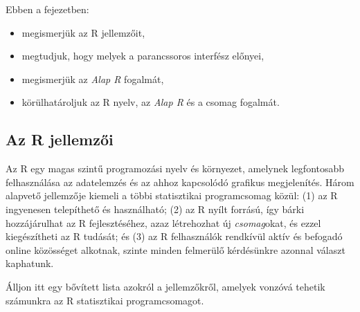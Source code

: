 \documentclass[
]{book}
\makeatletter
\providecommand{\tightlist}{%
  \setlength{\itemsep}{0pt}\setlength{\parskip}{0pt}}
\newenvironment{kframe}{%
\medskip{}
\setlength{\fboxsep}{.8em}
 \def\at@end@of@kframe{}%
 \ifinner\ifhmode%
  \def\at@end@of@kframe{\end{minipage}}%
  \begin{minipage}{\columnwidth}%
 \fi\fi%
 \def\FrameCommand##1{\hskip\@totalleftmargin \hskip-\fboxsep
 \colorbox{shadecolor}{##1}\hskip-\fboxsep
     \hskip-\linewidth \hskip-\@totalleftmargin \hskip\columnwidth}%
 \MakeFramed {\advance\hsize-\width
   \@totalleftmargin\z@ \linewidth\hsize
   \@setminipage}}%
 {\par\unskip\endMakeFramed%
 \at@end@of@kframe}
\newenvironment{rmdblock}[1]
  {
  \begin{itemize}
  \renewcommand{\labelitemi}{
    \raisebox{-.7\height}[0pt][0pt]{
      {\setkeys{Gin}{width=3em,keepaspectratio}\texttt{[image: images/\#1]}}
    }
  }
  \setlength{\fboxsep}{1em}
  \begin{kframe}
  \item
  }
  {
  \end{kframe}
  \end{itemize}
  }
\newenvironment{rmdlevel1}
  {\begin{rmdblock}{level1}}
  {\end{rmdblock}}
\makeatother
\begin{document}
\begin{rmdlevel1}
Ebben a fejezetben:

\begin{itemize}
\tightlist
\item
  megismerjük az R jellemzőit,
\item
  megtudjuk, hogy melyek a parancssoros interfész előnyei,
\item
  megismerjük az \emph{Alap R} fogalmát,
\item
  körülhatároljuk az R nyelv, az \emph{Alap R} és a csomag fogalmát.
\end{itemize}
\end{rmdlevel1}

\hypertarget{az-r-jellemzux151i}{%
\subsection{Az R jellemzői}\label{az-r-jellemzux151i}}

Az R egy magas szintű programozási nyelv és környezet, amelynek legfontosabb felhasználása az adatelemzés és az ahhoz kapcsolódó grafikus megjelenítés. Három alapvető jellemzője kiemeli a többi statisztikai programcsomag közül: (1) az R ingyenesen telepíthető és használható; (2) az R nyílt forrású, így bárki hozzájárulhat az R fejlesztéséhez, azaz létrehozhat új \emph{csomag}okat, és ezzel kiegészítheti az R tudását; és (3) az R felhasználók rendkívül aktív és befogadó online közösséget alkotnak, szinte minden felmerülő kérdésünkre azonnal választ kaphatunk.

Álljon itt egy bővített lista azokról a jellemzőkről, amelyek vonzóvá tehetik számunkra az R statisztikai programcsomagot.
\end{document}
